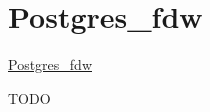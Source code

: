 \section{Postgres\_fdw}

\href{https://www.postgresql.org/docs/current/static/postgres-fdw.html}{Postgres\_fdw}

TODO